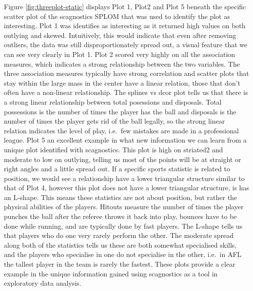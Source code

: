 Figure \ref{fig:threeplot-static} displays Plot 1, Plot2 and Plot 5
beneath the specific scatter plot of the scagnostics SPLOM that was used
to identify the plot as interesting. Plot 1 was identifies as
interesting as it returned high values on both outlying and skewed.
Intuitively, this would indicate that even after removing outliers, the
data was still disproportionately spread out, a visual feature that we
can see very clearly in Plot 1. Plot 2 scored very highly on all the
association measures, which indicates a strong relationship between the
two variables. The three association measures typically have strong
correlation and scatter plots that stay within the large mass in the
center have a linear relation, those that don't often have a non-linear
relationship. The splines vs dcor plot tells us that there is a strong
linear relationship between total posessions and disposals. Total
possessions is the number of times the player has the ball and disposals
is the number of times the player gets rid of the ball legally, so the
strong linear relation indicates the level of play, i.e.~few mistakes
are made in a professional league. Plot 5 an excellent example in what
new information we can learn from a unique plot identified with
scagnostics. This plot is high on striated2 and moderate to low on
outlying, telling us most of the points will be at straight or right
angles and a little spread out. If a specific sports statistic is
related to position, we would see a relationship have a lower triangular
structure similar to that of Plot 4, however this plot does not have a
lower triangular structure, is has an L-shape. This means these
statistics are not about position, but rather the physical abilities of
the players. Hitouts measure the number of times the player punches the
ball after the referee throws it back into play, bounces have to be done
while running, and are typically done by fast players. The L-shape tells
us that players who do one very rarely perform the other. The moderate
spread along both of the statistics tells us these are both somewhat
specialised skills, and the players who specialise in one do not
specialise in the other, i.e.~in AFL the tallest player in the team is
rarely the fastest. These plots provide a clear example in the unique
information gained using scagnostics as a tool in exploratory data
analysis.

